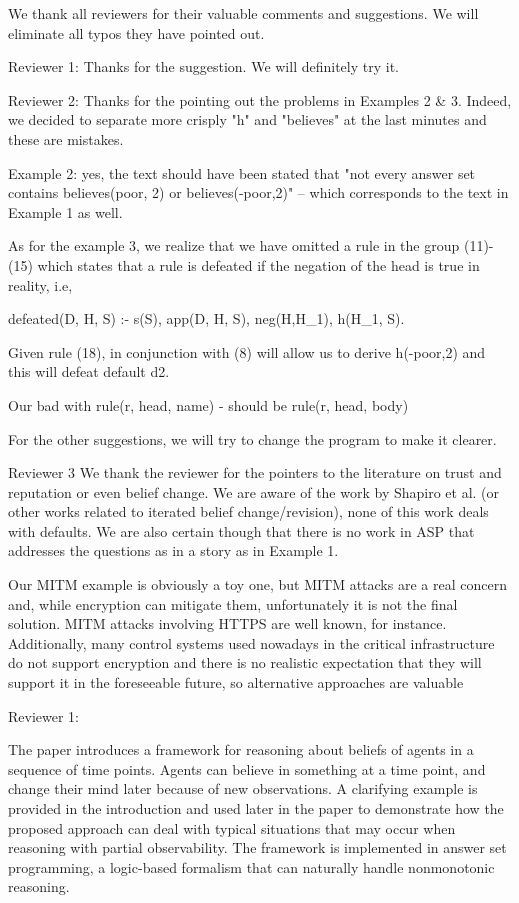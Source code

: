 We thank all reviewers for their valuable comments and suggestions. We will eliminate all typos they have pointed out. 

Reviewer 1: Thanks for the suggestion. We will definitely try it. 


Reviewer 2: 
Thanks for the pointing out the problems in Examples 2 & 3. Indeed, we decided to separate more crisply "h" and "believes" at the last minutes and these are mistakes.  

Example 2: yes, the text should have been stated that "not every answer set contains believes(poor, 2) or believes(-poor,2)" -- which corresponds to the text in Example 1 as well. 

As for the example 3, we realize that we have omitted a rule in the group (11)-(15) which states that a rule is defeated if the negation of the head is true in reality, i.e,  

defeated(D, H, S)  :-   s(S), app(D, H, S),  neg(H,H_1), h(H_1, S).  

Given rule (18), in conjunction with (8) will allow us to derive h(-poor,2) and this will defeat default d2.   

Our bad with rule(r, head, name) - should be rule(r, head, body) 

For the other suggestions, we will try to change the program to make it clearer. 


Reviewer 3 
We thank the reviewer for the pointers to the literature on trust and reputation or even belief change. We are aware of the work by Shapiro et al. (or other works related to iterated belief change/revision), none of this work deals with defaults.  We are also certain though that there is no work in ASP that addresses the questions as in a story as in Example 1. 

Our MITM example is obviously a toy one, but MITM attacks are a real concern and, while encryption can mitigate them, unfortunately it is not the final solution. MITM attacks involving HTTPS are well known, for instance. Additionally, many control systems used nowadays in the critical infrastructure do not support encryption and there is no realistic expectation that they will support it in the foreseeable future, so alternative approaches are valuable

Reviewer 1:

The paper introduces a framework for reasoning about beliefs of agents in a sequence of time points. Agents can believe in something at a time point, and change their mind later because of new observations. A clarifying example is provided in the introduction and used later in the paper to demonstrate how the proposed approach can deal with typical situations that may occur when reasoning with partial observability. The framework is implemented in answer set programming, a logic-based formalism that can naturally handle nonmonotonic reasoning.

